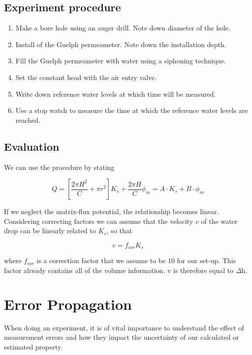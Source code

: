 \documentclass[
10pt, %
a4paper, %
oneside, %
headinclude,footinclude, %
BCOR5mm, %
]{scrartcl}
\begin{document}
 \subsection{Experiment procedure}
 \begin{enumerate}
 	\item Make a bore hole using an auger drill. Note down diameter of the hole.
 	\item Install of the Guelph permeameter. Note down the installation depth.
 	\item Fill the Guelph permeameter with water using a siphoning technique. 
 	\item Set the constant head with the air entry valve.
 	\item Write down reference water levels at which time will be measured.
 	\item Use a stop watch to measure the time at which the reference water levels are reached.
 \end{enumerate}
 
 \subsection{Evaluation}
 
 We can use the procedure by \cite{elrick1992methods} stating
 
 \begin{equation}
 Q= [\frac{2 \pi H^2}{C}+\pi r^2]K_s+\frac{2 \pi H}{C}\phi_m = A \cdot K_s +B \cdot \phi_m
 \end{equation}

If we neglect the matrix-flux potential, the relationship becomes linear. Considering correcting factors we can assume that the velocity $v$ of the water drop can be linearly related to $K_s$, so that

 
 \begin{equation}
 v= f_{cor} K_s
\end{equation}

where $f_{cor}$ is a correction factor that we assume to be 10 for our set-up. This factor already contains all of the volume information. v is therefore equal to $\Delta$h.

\section{Error Propagation}

When doing an experiment, it is of vital importance to understand the effect of measurement errors and how they impact the uncertainty of our calculated or estimated property. 
\end{document}
